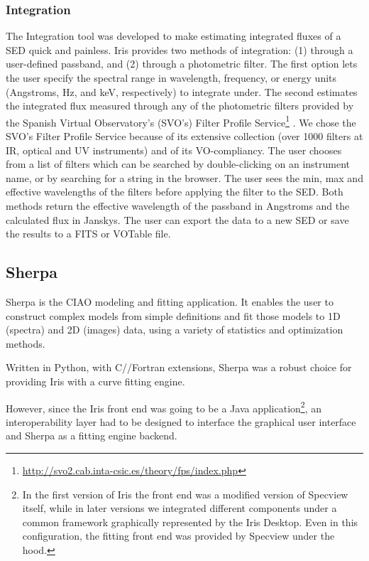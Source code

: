 \documentclass[5p]{elsarticle}
\begin{document}
\subsubsection{Integration}
The Integration tool was developed to make estimating integrated fluxes of a SED quick and painless. Iris provides two methods of integration: (1) through a user-defined passband, and (2) through a photometric filter. The first option lets the user specify the spectral range in wavelength, frequency, or energy units (Angstroms, Hz, and keV, respectively) to integrate under. The second estimates the integrated flux measured through any of the photometric filters provided by the Spanish Virtual Observatory's (SVO's) Filter Profile Service\footnote{\url{http://svo2.cab.inta-csic.es/theory/fps/index.php}} \citep{2013arXiv1312.3249S}. We chose the SVO's Filter Profile Service because of its extensive collection (over 1000 filters at IR, optical and UV instruments) and of its VO-compliancy. The user chooses from a list of filters which can be searched by double-clicking on an instrument name, or by searching for a string in the browser. The user sees the min, max and effective wavelengths of the filters before applying the filter to the SED.
Both methods return the effective wavelength of the passband in Angstroms and the calculated flux in Janskys. The user can export the data to a new SED or save the results to a FITS or VOTable file.

\subsection{Sherpa}
\label{subsec:sherpa}
Sherpa is the CIAO modeling and fitting application. It enables the user to construct complex models from simple definitions and fit those models to 1D (spectra) and 2D (images) data, using a variety of statistics and optimization methods.

Written in Python, with C/\Cpp/Fortran extensions, Sherpa was a robust choice for providing Iris with a curve fitting engine.

However, since the Iris front end was going to be a Java application\footnote{In the first version of Iris the front end was a modified version of Specview itself, while in later versions we integrated different components under a common framework graphically represented by the Iris Desktop. Even in this configuration, the fitting front end was provided by Specview under the hood.}, an interoperability layer had to be designed to interface the graphical user interface and Sherpa as a fitting engine backend.
\end{document}
